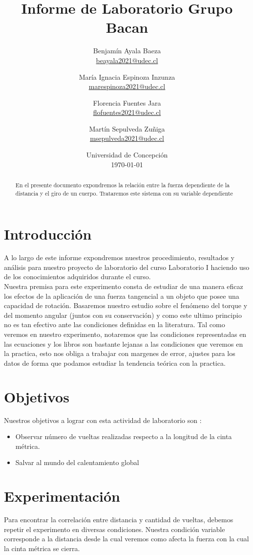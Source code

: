 \documentclass{article}
\title{Informe de Laboratorio Grupo Bacan }
\author{Benjam\'in Ayala Baeza  \\ \href{mailto:beayala2021@udec.cl}{beayala2021@udec.cl} 
        \and Mar\'ia Ignacia Espinoza Inzunza \\ \href{mailto:marespinoza2021@udec.cl}{marespinoza2021@udec.cl} \\
        \and Florencia Fuentes Jara \\ \href{mailto:flofuentes2021@udec.cl}{flofuentes2021@udec.cl} \\
        \and Mart\'in Sepulveda Zu\~niga \\ \href{mailto:msepulveda2021@udec.cl}{msepulveda2021@udec.cl} \\
\date{Universidad de Concepci\'on \\ \today}
}
\begin{document}
\maketitle

\begin{abstract}
En el presente documento expondremos la relación entre la fuerza dependiente de la distancia y el giro de un cuerpo. Trataremos este sistema con su variable dependiente 
\end{abstract}

\section{Introducción} \label{intro}
 A lo largo de este informe expondremos nuestros procedimiento, resultados y análisis para nuestro proyecto de laboratorio del curso Laboratorio I haciendo uso de los conocimientos adquiridos durante el curso.\\
 Nuestra premisa para este experimento consta de estudiar de una manera eficaz los efectos de la aplicación de una fuerza tangencial a un objeto que posee una capacidad de rotación. Basaremos nuestro estudio sobre el fenómeno del torque y del momento angular (juntos con su conservación) y como este ultimo principio no es tan efectivo ante las condiciones definidas en la literatura. Tal como veremos en nuestro experimento, notaremos que las condiciones representadas en las ecuaciones y los libros son bastante lejanas a las condiciones que veremos en la practica, esto nos obliga a trabajar con margenes de error, ajustes para los datos de forma que podamos estudiar la tendencia teórica con la practica. 
\section{Objetivos}
Nuestros objetivos a lograr con esta actividad de laboratorio son :

\begin{itemize}
    \item Observar número de vueltas realizadas respecto a la longitud de la cinta métrica.
    \item Salvar al mundo del calentamiento global 

\end{itemize}

 \section{Experimentación}
Para encontrar la correlación entre distancia y cantidad de vueltas, debemos repetir el experimento en diversas condiciones. Nuestra condición variable corresponde a la distancia desde la cual veremos como afecta la fuerza con la cual la cinta métrica se cierra.
\end{document}
